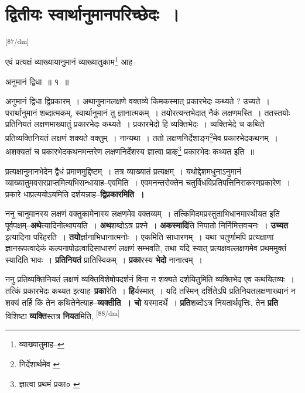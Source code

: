 \documentclass[article,12pt,a4paper]{memoir}
\begin{document}
	    
	    \endnumbering%
	    \endgroup
	    
	  
	  
	
	    
	    \begingroup
	    \beginnumbering%
	    
	  
\chapter[{द्वितीयः स्वार्थानुमानपरिच्छेदः ।}]{द्वितीयः स्वार्थानुमानपरिच्छेदः ।}\leavevmode\textsuperscript{\rmlatinfont\tiny [87/dm]}

	  \pstart एवं प्रत्यक्षं व्याख्यायानुमानं व्याख्यातुकाम\footnote{व्याख्यातुमाह--\cite{dp-msA}} आह--
	\pend
       

	  \pstart अनुमानं द्विधा ॥ १ ॥
	\pend
       

	  \pstart अनुमानं द्विधा द्विप्रकारम् । अथानुमानलक्षणे वक्तव्ये किमकस्मात् प्रकारभेदः कथ्यते ? उच्यते । परार्थानुमानं शब्दात्मकम्, स्वार्थानुमानं तु ज्ञानात्मकम् । तयोरत्यन्तभेदात् नैकं लक्षणमस्ति । ततस्तयोः प्रतिनियतं लक्षणमाख्यातुं प्रकारभेदः कथ्यते । प्रकारभेदो हि व्यक्तिभेदः । व्यक्तिभेदे च कथिते प्रतिव्यक्तिनियतं लक्षणं शक्यते वक्तुम् । नान्यथा । ततो लक्षणनिर्देशाङ्ग\footnote{निर्देशार्थमेव \cite{dp-msA} \cite{dp-msC}}मेव प्रकारभेदकथनम् । अशक्यतां च प्रकारभेदकथनमन्तरेण लक्षणनिर्देशस्य ज्ञात्वा प्राक्\footnote{ज्ञात्वा प्रथमं प्रका० \cite{dp-msC} \cite{dp-msD}} प्रकारभेदः कथ्यत इति ॥
	\pend
      

	  \pstart प्रत्यक्षानुमानभेदेन द्वैधं प्रमाणमुद्दिष्टम् । तत्र व्याख्यातं प्रत्यक्षम् । यथोद्देशमधुनाऽनुमानं व्याख्यातुमवसरप्राप्तमित्यभिसन्धायाह--एवमिति । एवमनन्तरोक्तेन चतुर्विधविप्रतिपत्तिनिराकरणप्रकारेण । प्रकारे धाप्रत्ययोऽयमिति दर्शयन्नाह--\textbf{द्विप्रकारमिति ।}
	\pend
      

	  \pstart ननु चानुमानस्य लक्षणं वक्तुकामेनास्य लक्षणमेव वक्तव्यम् । तत्किमिदमप्रस्तुताभिधानमास्थीयत इति पूर्वपक्षम्--\textbf{अथे}त्यादिनोत्थापयति । \textbf{अथ}शब्दोऽत्र प्रश्ने । \textbf{अकस्मादि}ति निपातो निर्निमित्तवचनः । \textbf{उच्यत} इत्यादिना परिहरति । \textbf{तयो}र्ज्ञानाभिधानात्मनोः । एकमिति साधारणम् । यथा चतुर्णामपि प्रत्यक्षाणां ज्ञानरूपत्वादेकं कल्पनापोढत्वादिसाधारणं लक्षणं सम्भवति, तथा यदि स्यात् प्रत्यक्षवल्लक्षणमेव प्रथममुक्तं स्यादिति भावः । \textbf{प्रतिनियतं} प्रातिस्विकम् । \textbf{प्रका}रस्य \textbf{भेदो} नानात्वम् ।
	\pend
      

	  \pstart ननु प्रतिव्यक्तिनियतं लक्षणं व्यक्तिविशेषोपदर्शनं विना न शक्यते दर्शयितुमिति व्यक्तिभेद एव कथयितव्यः । तत्किं प्रकारभेदः कथ्यत इत्याह--\textbf{प्रका}रेति । \textbf{हि}र्यस्मात् । यदि तस्मिन् दर्शितेऽपि प्रतिनियतलक्षणाख्यानं न शक्यं तर्हि किं तेन कथितेनेत्याह--\textbf{व्यक्तीति । चो} यस्मादर्थे । \textbf{प्रति}शब्दोऽत्र नियतार्थवृत्तिः, तेन \textbf{प्रति} विशिष्टा \textbf{व्यक्ति}स्तत्र \textbf{नियत}मिति,  \leavevmode\textsuperscript{\rmlatinfont\tiny [88/dm]} 
	  
\end{document}
